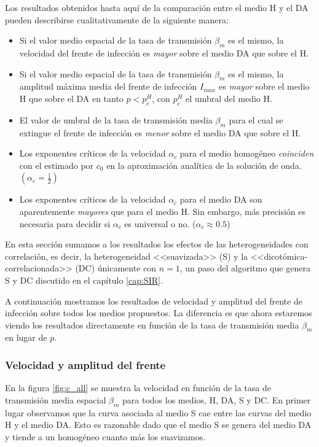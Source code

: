 Los resultados obtenidos hasta aquí de la comparación entre el medio H y el DA pueden describirse cualitativamente de la siguiente manera: 
 \begin{itemize}
     \item Si el valor medio espacial de la tasa de transmisión $\beta_m$ es el mismo, la velocidad del frente de infección es \textit{mayor} sobre el medio 
     DA que sobre el H.
     \item Si el valor medio espacial de la tasa de transmisión $\beta_m$ es el mismo, la amplitud máxima media del frente de infección $I_{max}$ es 
     \textit{mayor} sobre el medio H que sobre el DA en tanto $p<p_c^H$, con $p_c^{H}$ el umbral del medio H.
     \item El valor de umbral de la tasa de transmisión media $\beta_m$ para el cual se extingue el frente de infección es \textit{menor} sobre el medio DA que sobre el H.
     \item Los exponentes críticos de la velocidad $\alpha_c$ para el medio homogéneo \textit{coinciden} con el estimado por $c_0$ en la aproximación analítica de la solución de onda. $(\alpha_c = \frac{1}{2})$
     \item Los exponentes críticos de la velocidad $\alpha_c$ para el medio DA son aparentemente \textit{mayores} que para el medio H. Sin embargo, más precisión es necesaria para decidir si $\alpha_c$ es universal o no. ($\alpha_c\approx0.5$)
 \end{itemize}

 

En esta sección sumamos a los resultados los efectos de las heterogeneidades con correlación, es decir, la heterogeneidad <<suavizada>> (S) y la <<dicotómica-correlacionada>> (DC) únicamente con $n = 1$, un paso del algoritmo que genera S y DC discutido en el capítulo \ref{cap:SIR}.


A continuación mostramos los resultados de velocidad y amplitud del frente de infección sobre todos los medios propuestos. La diferencia es que ahora estaremos viendo los resultados directamente en función de la tasa de transmisión media $\beta_m$ en lugar de $p$.


\subsubsection*{Velocidad y amplitud del frente}

En la figura \ref{fig:c_all} se muestra la velocidad en función de la tasa de transmisión media espacial $\beta_m$ para todos los medios, H, DA, S y DC. En primer lugar observamos que la curva asociada al medio S cae entre las curvas del medio H y el medio DA. Esto es razonable dado que el medio S se genera del medio DA y tiende a un homogéneo cuanto más los suavizamos.

